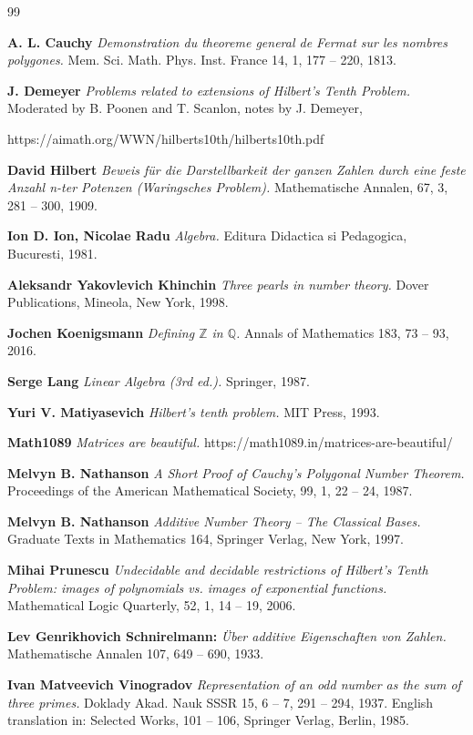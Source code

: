 \documentclass{article}
\theoremstyle{plain}
\theoremstyle{definition}
\begin{document}
\begin{thebibliography}{99} 

{\bf A. L. Cauchy}
{\it Demonstration du theoreme general de Fermat sur les nombres polygones.}
 Mem. Sci. Math. Phys. Inst.  France 14, 1, 177 – 220, 1813.

{\bf J. Demeyer}
{\it Problems related to extensions of Hilbert's Tenth Problem.}
Moderated by B. Poonen and T. Scanlon, notes by J. Demeyer,

https://aimath.org/WWN/hilberts10th/hilberts10th.pdf 

{\bf David Hilbert}
{\it Beweis für die Darstellbarkeit der ganzen Zahlen durch eine feste Anzahl n-ter Potenzen (Waringsches Problem).}
 Mathematische Annalen, 67, 3,  281 -- 300, 1909.

{\bf Ion D. Ion, Nicolae Radu}
{\it Algebra.}
Editura Didactica si Pedagogica, Bucuresti, 1981.

{\bf Aleksandr Yakovlevich Khinchin}
{\it Three pearls in number theory.}
Dover Publications, Mineola, New York, 1998.

{\bf Jochen Koenigsmann}
{\it Defining $\mathbb Z$ in $\mathbb Q$.}
Annals of Mathematics 183, 73 -- 93, 2016. 


{\bf Serge Lang}
{\it Linear Algebra (3rd ed.).}
Springer, 1987.

{\bf Yuri V. Matiyasevich}
{\it Hilbert's tenth problem.}
 MIT Press, 1993. 

{\bf Math1089}
{\it Matrices are beautiful.}
https://math1089.in/matrices-are-beautiful/ 


{\bf Melvyn B. Nathanson}
{\it A Short Proof of Cauchy's Polygonal Number Theorem.}
Proceedings of the American Mathematical Society, 
99, 1,  22 -- 24, 1987. 

{\bf Melvyn B. Nathanson}
{\it Additive Number Theory -- The Classical Bases.}
Graduate Texts in Mathematics 164,
Springer Verlag, New York, 1997. 

{\bf Mihai Prunescu}
{\it Undecidable and decidable restrictions of Hilbert's Tenth Problem: images of polynomials vs. images of exponential functions.}
Mathematical Logic Quarterly, 52, 1, 14 -- 19, 2006.

{\bf Lev Genrikhovich Schnirelmann:}
{\it  \"Uber additive Eigenschaften von Zahlen.}
Mathematische Annalen 107, 649 – 690, 1933. 

{\bf Ivan Matveevich Vinogradov}
{\it Representation of an odd number as the sum of three primes.} 
Doklady Akad. Nauk SSSR 15, 6 -- 7, 291 -- 294,  1937. 
English translation in: Selected Works, 101 -- 106, Springer Verlag, Berlin, 1985.
 

\end{thebibliography}
\end{document}
